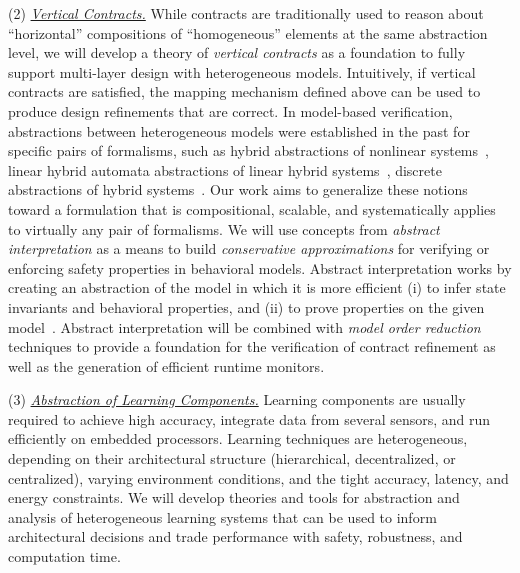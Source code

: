 \documentclass[10pt]{dod-blank}
\begin{document}
(2) \underline{\textit{Vertical Contracts.}} While contracts are traditionally used to reason about ``horizontal'' compositions of ``homogeneous'' elements at the same abstraction level, we will develop a theory of \emph{vertical contracts} as a foundation to fully support  multi-layer design with heterogeneous models. 
Intuitively, if vertical contracts are satisfied, the mapping mechanism defined above can be used to produce design refinements that are correct. In model-based verification, abstractions between heterogeneous models were established in the past for specific pairs of formalisms, such as hybrid abstractions of nonlinear systems~\cite{Henzinger98,Dang10}, linear hybrid automata abstractions of linear
hybrid systems~\cite{Frehse2008}, discrete abstractions of hybrid systems~\cite{Alur00,Alur2006,Chutinan01}. Our work aims to generalize these notions toward a formulation that is compositional, scalable, and systematically applies to virtually any pair of formalisms. 
We will use concepts from \emph{abstract interpretation} as a means to build \emph{conservative approximations} for verifying or enforcing safety properties in behavioral models. Abstract interpretation works by creating an 
abstraction of the model in which it is more efficient (i)
to infer state invariants and behavioral properties, and (ii) to prove properties on the given model~\cite{Cousot77,Passerone2007}. 
Abstract interpretation will be combined with \emph{model order reduction} techniques to provide a foundation for the  verification of contract refinement as well as the generation of efficient runtime monitors.

(3) \underline{\textit{Abstraction of Learning Components.}} Learning components are usually required to achieve high accuracy, integrate data from several sensors, and run efficiently on embedded processors. Learning techniques are heterogeneous, depending on their  architectural structure (hierarchical, decentralized, or centralized), varying environment conditions, and the tight accuracy, latency, and energy constraints.  
We will develop theories and tools for abstraction and analysis of heterogeneous learning systems that can be used to inform architectural decisions and trade performance with safety, robustness, and computation time.
\end{document}
